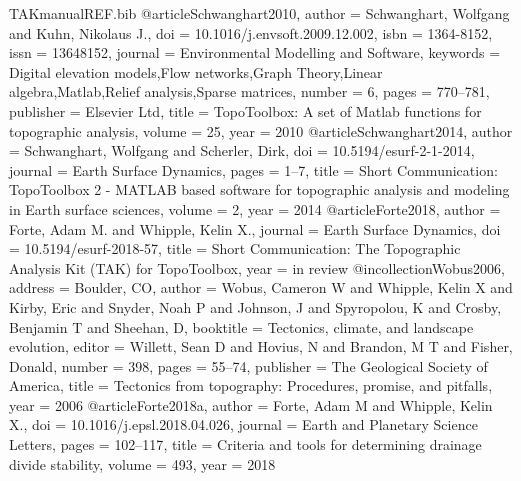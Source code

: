 \begin{filecontents}{TAKmanualREF.bib}
	@article{Schwanghart2010,
		author = {Schwanghart, Wolfgang and Kuhn, Nikolaus J.},
		doi = {10.1016/j.envsoft.2009.12.002},
		isbn = {1364-8152},
		issn = {13648152},
		journal = {Environmental Modelling and Software},
		keywords = {Digital elevation models,Flow networks,Graph Theory,Linear algebra,Matlab,Relief analysis,Sparse matrices},
		number = {6},
		pages = {770--781},
		publisher = {Elsevier Ltd},
		title = {{TopoToolbox: A set of Matlab functions for topographic analysis}},
		volume = {25},
		year = {2010}
	}
	@article{Schwanghart2014,
		author = {Schwanghart, Wolfgang and Scherler, Dirk},
		doi = {10.5194/esurf-2-1-2014},
		journal = {Earth Surface Dynamics},
		pages = {1--7},
		title = {{Short Communication: TopoToolbox 2 - MATLAB based software for topographic analysis and modeling in Earth surface sciences}},
		volume = {2},
		year = {2014}
	}
	@article{Forte2018,
		author = {Forte, Adam M. and Whipple, Kelin X.},
		journal = {Earth Surface Dynamics},
		doi = {10.5194/esurf-2018-57},
		title = {{Short Communication: The Topographic Analysis Kit (TAK) for TopoToolbox}},
		year = {in review}
	}
@incollection{Wobus2006,
	address = {Boulder, CO},
	author = {Wobus, Cameron W and Whipple, Kelin X and Kirby, Eric and Snyder, Noah P and Johnson, J and Spyropolou, K and Crosby, Benjamin T and Sheehan, D},
	booktitle = {Tectonics, climate, and landscape evolution},
	editor = {Willett, Sean D and Hovius, N and Brandon, M T and Fisher, Donald},
	number = {398},
	pages = {55--74},
	publisher = {The Geological Society of America},
	title = {{Tectonics from topography: Procedures, promise, and pitfalls}},
	year = {2006}
}
@article{Forte2018a,
	author = {Forte, Adam M and Whipple, Kelin X.},
	doi = {10.1016/j.epsl.2018.04.026},
	journal = {Earth and Planetary Science Letters},
	pages = {102--117},
	title = {{Criteria and tools for determining drainage divide stability}},
	volume = {493},
	year = {2018}
}


\end{filecontents}

\documentclass[titlepage]{article}
\usepackage{filecontents} %
\usepackage{bibentry} %
\usepackage{natbib}
\usepackage{authblk} %
\usepackage{listings} %
\usepackage{hyperref} %
\usepackage[title]{appendix}
\usepackage{color} %
\usepackage{graphicx} %
\usepackage[cc]{titlepic}
\usepackage{float} %
\usepackage[left=2.5cm, right=2.5cm, top=4cm, bottom=4cm]{geometry} %
\usepackage{textcomp} %
\usepackage{subcaption} %
\renewcommand{\rmdefault}{ptm} %
\hypersetup{
	colorlinks=true,
	linkcolor=blue,
	citecolor=blue,
	urlcolor=cyan,
}


